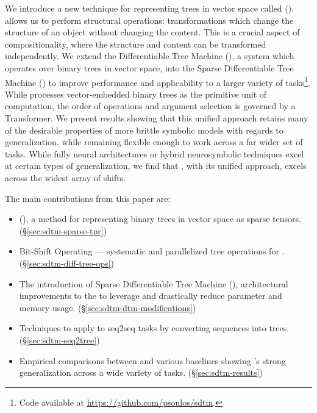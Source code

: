 We introduce a new technique for representing trees in vector space called \fullrepname (\abvrepname). \abvrepname allows us to perform structural operations: transformations which change the structure of an object without changing the content. This is a crucial aspect of compositionality, where the structure and content can be transformed independently. We extend the Differentiable Tree Machine (\dtm), a system which operates over binary trees in vector space, into the Sparse Differentiable Tree Machine (\sdtm) to improve performance and applicability to a larger variety of tasks\footnote{Code available at \url{https://github.com/psoulos/sdtm}.}. While \dtm processes vector-embedded binary trees as the primitive unit of computation, the order of operations and argument selection is governed by a Transformer. We present results showing that this unified approach retains many of the desirable properties of more brittle symbolic models with regards to generalization, while remaining flexible enough to work across a far wider set of tasks. 
While fully neural architectures or hybrid neurosymbolic techniques excel at certain types of generalization, we find that \dtm, with its unified approach,  excels across the widest array of shifts.


The main contributions from this paper are:
\begin{itemize}
  \item \fullrepname (\abvrepname), a method for representing binary trees in vector space as sparse tensors. (\S\ref{sec:sdtm-sparse-tpr})
  \item Bit-Shift Operating --- systematic and parallelized tree operations for \abvrepname. (\S\ref{sec:sdtm-diff-tree-ops})
  \item The introduction of Sparse Differentiable Tree Machine (\sdtm), architectural improvements to the \dtm to leverage \abvrepname and drastically reduce parameter and memory usage. (\S\ref{sec:sdtm-dtm-modifications})
  \item Techniques to apply \dtm to seq2seq tasks by converting sequences into trees. (\S\ref{sec:sdtm-seq2tree})
  \item Empirical comparisons between \sdtm and various baselines showing \sdtm's strong generalization across a wide variety of tasks. (\S\ref{sec:sdtm-results})
\end{itemize}


